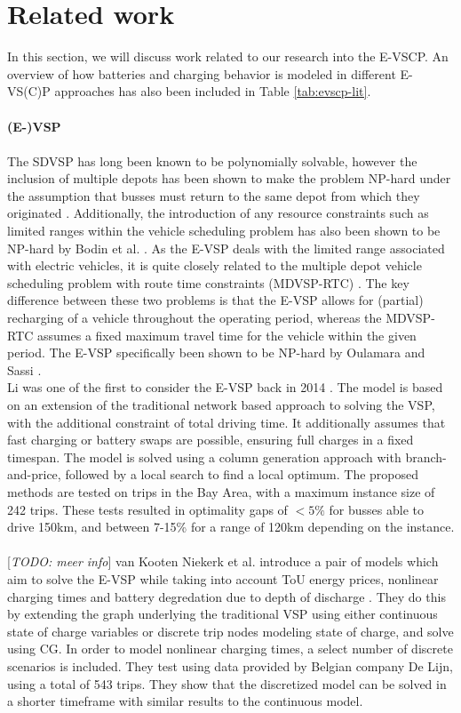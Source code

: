 \documentclass[ht]{article}
\newcommand{\todo}[1]{{\color{red}[\textit{TODO: #1}]}}
\begin{document}
\section{Related work}
In this section, we will discuss work related to our research into the E-VSCP.  An overview of how batteries and charging behavior is modeled in different E-VS(C)P approaches has also been included in Table \ref{tab:evscp-lit}.  \\\\ 
\noindent \textbf{(E-)VSP} \\\\
The SDVSP has long been known to be polynomially solvable, however the inclusion of multiple depots has been shown to make the problem NP-hard under the assumption that busses must return to the same depot from which they originated \cite{Bunte2009}. Additionally, the introduction of any resource constraints such as limited ranges within the vehicle scheduling problem has also been shown to be NP-hard by Bodin et al. \cite{Bodin1983}. As the E-VSP deals with the limited range associated with electric vehicles, it is quite closely related to the multiple depot vehicle scheduling problem with route time constraints (MDVSP-RTC) \cite{Haghani2002}. The key difference between these two problems is that the E-VSP allows for (partial) recharging of a vehicle throughout the operating period, whereas the MDVSP-RTC assumes a fixed maximum travel time for the vehicle within the given period. The E-VSP specifically been shown to be NP-hard by Oulamara and Sassi \cite{Sassi2014}. \\
\cite{Haghani2002}
Li was one of the first to consider the E-VSP back in 2014 \cite{Li2014}. The model is based on an extension of the traditional network based approach to solving the VSP, with the additional constraint of total driving time. It additionally assumes that fast charging or battery swaps are possible, ensuring full charges in a fixed timespan. The model is solved using a column generation approach with branch-and-price, followed by a local search to find a local optimum. The proposed methods are tested on trips in the Bay Area, with a maximum instance size of 242 trips. These tests resulted in optimality gaps of $<5\%$ for busses able to drive 150km, and between 7-15\% for a range of 120km depending on the instance.  \\\\
\todo{meer info} van Kooten Niekerk et al. introduce a pair of models which aim to solve the E-VSP while taking into account ToU energy prices, nonlinear charging times and battery degredation due to depth of discharge \cite{vanKootenNiekerk2017}. They do this by extending the graph underlying the traditional VSP using either continuous state of charge variables or discrete trip nodes modeling state of charge, and solve using CG. In order to model nonlinear charging times, a select number of discrete scenarios is included. They test using data provided by Belgian company De Lijn, using a total of 543 trips. They show that the discretized model can be solved in a shorter timeframe with similar results to the continuous model. \\\\
\end{document}
